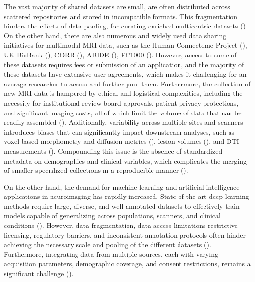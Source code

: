 The vast majority of shared datasets are small, are often distributed across scattered repositories 
and stored in incompatible formats. This fragmentation hinders the efforts of data pooling, for curating enriched
multicentric datasets (\cite{dishner2024survey}). On the other hand, there are also numerous and 
widely used data sharing initiatives for multimodal MRI data, such as the Human Connectome Project
(\cite{van2013wu}), UK BioBank (\cite{miller2016multimodal}), CORR (\cite{gorgolewski2017preprocessed}), ABIDE 
(\cite{di2014autism}), FC1000 (\cite{biswal2010toward}). However, access to some of these datasets 
requires fees or submission of an application, and the majority of these datasets have extensive 
user agreements, which makes it challenging for an average researcher to access and further pool them.
Furthermore, the collection of new MRI data is hampered by ethical and logistical complexities, 
including the necessity for institutional review board approvals, patient privacy protections, 
and significant imaging costs, all of which limit the volume of data that can be readily assembled
(\cite{white2022data, sardanelli2018share}).
Additionally, variability across multiple sites and scanners introduces biases that can significantly 
impact downstream analyses, such as voxel-based morphometry and diffusion metrics 
(\cite{takao2014effects}), lesion volumes (\cite{shinohara2017volumetric}), and DTI measurements (\cite{zhu2011quantification}). 
Compounding this issue is the absence of standardized metadata on demographics and clinical variables, 
which complicates the merging of smaller specialized collections in a reproducible manner (\cite{pomponio2019harmonization}).

On the other hand, the demand for machine learning and artificial intelligence applications in 
neuroimaging has rapidly increased. State-of-the-art deep learning methods require large, diverse, 
and well-annotated datasets to effectively train models capable of generalizing across populations, 
scanners, and clinical conditions (\cite{dishner2024survey}). However, data fragmentation, data access limitations 
restrictive licensing, regulatory barriers, and inconsistent annotation protocols often hinder achieving the necessary 
scale and pooling of the different datasets (\cite{goldfarb2022ai}). Furthermore, integrating data from multiple sources, 
each with varying acquisition parameters, demographic coverage, and consent restrictions, remains a significant challenge 
(\cite{pomponio2019harmonization}).

